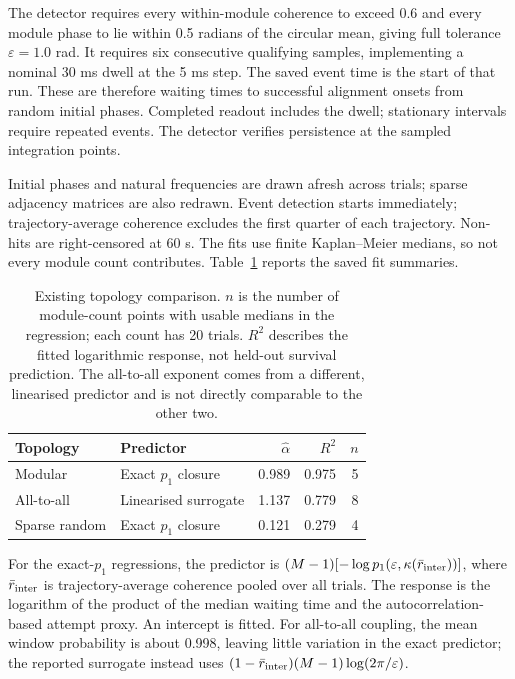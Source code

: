 \documentclass[11pt]{article}
\begin{document}
The detector requires every within-module coherence to exceed 0.6
and every module phase to lie within 0.5 radians of the circular
mean, giving full tolerance $\varepsilon=1.0$ rad. It requires six
consecutive qualifying samples, implementing a nominal 30 ms dwell
at the 5 ms step. The saved event time is the start of that run.
These are therefore waiting times to successful alignment onsets
from random initial phases. Completed readout includes the dwell;
stationary intervals require repeated events. The detector verifies
persistence at the sampled integration points.

Initial phases and natural frequencies are drawn afresh across trials;
sparse adjacency matrices are also redrawn. Event detection starts immediately;
trajectory-average coherence excludes the first quarter of each
trajectory. Non-hits are right-censored at 60 s. The fits use finite
Kaplan--Meier medians, so not every module count contributes.
Table~\ref{tab:topology} reports the saved fit summaries.

\begin{table}[tb]
\centering
\caption{Existing topology comparison. $n$ is the number of module-count
points with usable medians in the regression; each count has 20 trials.
$R^2$ describes the fitted logarithmic response, not held-out
survival prediction. The all-to-all exponent comes from a different,
linearised predictor and is not directly comparable to the other two.}
\label{tab:topology}
\begin{tabular}{llrrr}
\toprule
Topology & Predictor & $\hat\alpha$ & $R^2$ & $n$\\
\midrule
Modular & Exact $p_1$ closure & 0.989 & 0.975 & 5\\
All-to-all & Linearised surrogate & 1.137 & 0.779 & 8\\
Sparse random & Exact $p_1$ closure & 0.121 & 0.279 & 4\\
\bottomrule
\end{tabular}
\end{table}

For the exact-$p_1$ regressions, the predictor is
$(M-1)[-\log p_1(\varepsilon,\kappa(\bar r_{\rm inter}))]$,
where $\bar r_{\rm inter}$ is trajectory-average coherence pooled
over all trials. The response is the logarithm of the product of the median
waiting time and the autocorrelation-based attempt proxy.
An intercept is fitted. For all-to-all coupling, the mean window
probability is about 0.998, leaving little variation in the exact
predictor; the reported surrogate instead uses
$(1-\bar r_{\rm inter})(M-1)\log(2\pi/\varepsilon)$.
\end{document}
